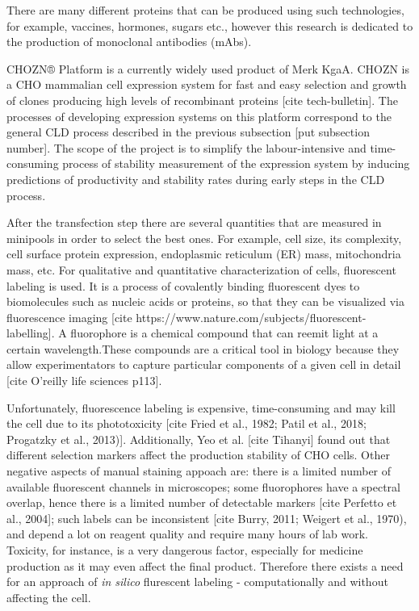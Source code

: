 There are many different proteins that can be produced using such technologies, for example, vaccines, hormones, sugars etc., however this research is dedicated to the production of monoclonal antibodies (mAbs). 

CHOZN® Platform is a currently widely used product of Merk KgaA. CHOZN is a CHO mammalian cell expression system for fast and easy selection and growth of clones producing high levels of recombinant proteins [cite tech-bulletin]. The processes of developing expression systems on this platform correspond to the general CLD process described in the previous subsection [put subsection number]. The scope of the project is to simplify the labour-intensive and time-consuming process of stability measurement of the expression system by inducing predictions of productivity and stability rates during early steps in the CLD process. 

After the transfection step there are several quantities that are measured in minipools in order to select the best ones. For example, cell size, its complexity, cell surface protein expression, endoplasmic reticulum (ER) mass, mitochondria mass, etc. For qualitative and quantitative characterization of cells, fluorescent labeling is used. It is a process of covalently binding fluorescent dyes to biomolecules such as nucleic acids or proteins, so that they can be visualized via fluorescence imaging [cite https://www.nature.com/subjects/fluorescent-labelling]. A fluorophore is a chemical compound that can reemit light at a certain wavelength.These compounds are a critical tool in biology because they allow experimentators to capture particular components of a given cell in detail [cite O'reilly life sciences p113].

Unfortunately, fluorescence labeling is expensive, time-consuming and may kill the cell due to its phototoxicity [cite Fried et al., 1982; Patil et al., 2018; Progatzky et al., 2013)]. Additionally, Yeo et al. [cite Tihanyi] found out that different selection markers affect the production stability of CHO cells. Other negative aspects of manual staining appoach are: there is a limited number of available fluorescent channels in microscopes; some fluorophores have a spectral overlap, hence there is a limited number of detectable markers [cite Perfetto et al., 2004]; such labels can be inconsistent [cite Burry, 2011; Weigert et al., 1970), and depend a lot on reagent quality and require many hours of lab work. Toxicity, for instance, is a very dangerous factor, especially for medicine production as it may even affect the final product. Therefore there exists a need for an approach of \textit{in silico} flurescent labeling - computationally and without affecting the cell. 

